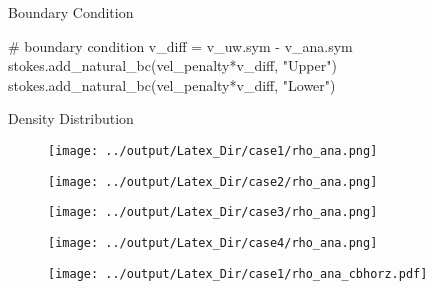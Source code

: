 \documentclass[10pt,aspectratio=169]{beamer}
\begin{document}
\begin{frame}[fragile]{Boundary Condition}
	\begin{python}
		# boundary condition
		v_diff =  v_uw.sym - v_ana.sym
		stokes.add_natural_bc(vel_penalty*v_diff, "Upper")
		stokes.add_natural_bc(vel_penalty*v_diff, "Lower")
	\end{python}
\end{frame}


\begin{frame}[fragile]{Density Distribution}
	\begin{figure}[!htb]
		\begin{multicols}{4}
			\texttt{[image: ../output/Latex\_Dir/case1/rho\_ana.png]}\par
			\hspace{0.75in}
			\texttt{[image: ../output/Latex\_Dir/case2/rho\_ana.png]}\par
			\hspace{1.5in}
			\texttt{[image: ../output/Latex\_Dir/case3/rho\_ana.png]}\par
			\hspace{2.25in}
			\texttt{[image: ../output/Latex\_Dir/case4/rho\_ana.png]}\par
		\end{multicols}
	\end{figure}
	
	\vspace{-0.4in}
	
	\begin{figure}
		\hspace{0.2in} 
		\texttt{[image: ../output/Latex\_Dir/case1/rho\_ana\_cbhorz.pdf]}
	\end{figure}
\end{frame}
\end{document}
